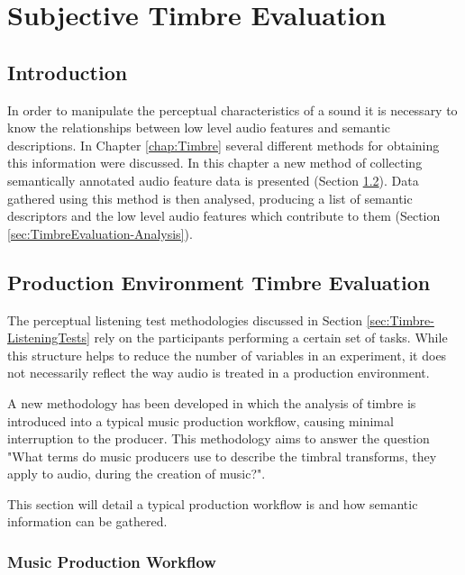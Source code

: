 \chapter{Subjective Timbre Evaluation}
\label{chap:TimbreEvaluation}

\section{Introduction}
\label{sec:TimbreEvaluation-Introduction}
	In order to manipulate the perceptual characteristics of a sound it is necessary to know the relationships between
	low level audio features and semantic descriptions. In Chapter \ref{chap:Timbre} several different methods for
	obtaining this information were discussed.  In this chapter a new method of collecting semantically annotated audio
	feature data is presented (Section \ref{sec:TimbreEvaluation-DAWBasedTimbreEvaluation}). Data gathered using this
	method is then analysed, producing a list of semantic descriptors and the low level audio features which contribute
	to them (Section \ref{sec:TimbreEvaluation-Analysis}).

\section{Production Environment Timbre Evaluation} %
\label{sec:TimbreEvaluation-DAWBasedTimbreEvaluation}
	The perceptual listening test methodologies discussed in Section \ref{sec:Timbre-ListeningTests} rely on the
	participants performing a certain set of tasks. While this structure helps to reduce the number of variables in an
	experiment, it does not necessarily reflect the way audio is treated in a production environment.

	A new methodology has been developed in which the analysis of timbre is introduced into a typical music production
	workflow, causing minimal interruption to the producer. This methodology aims to answer the question "What terms do
	music producers use to describe the timbral transforms, they apply to audio, during the creation of music?". 

	This section will detail a typical production workflow is and how semantic information can be gathered.

	\subsection{Music Production Workflow}
	\label{sec:TimbreEvaluation-DAWBasedTimbreEvaluation-Workflow}

